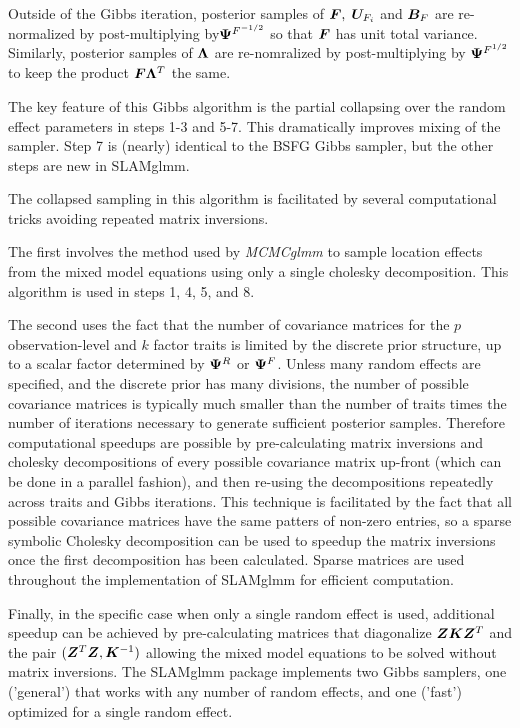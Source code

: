 \documentclass[11pt]{amsart}
\newcommand*{\B}[1]{\ifmmode\bm{#1}\else\textbf{#1}\fi}
\begin{document}
Outside of the Gibbs iteration, posterior samples of $\B{F},\; \B{U}_{F_i}$  and $\B{B}_F$ are re-normalized by post-multiplying by$\B{\Psi}^{F^{-1/2}}$ so that $\B{F}$ has unit total variance. Similarly, posterior samples of $\B{\Lambda}$ are re-nomralized by post-multiplying by $\B{\Psi}^{F^{1/2}}$ to keep the product $\B{F\Lambda}^T$ the same.


The key feature of this Gibbs algorithm is the partial collapsing over the random effect parameters in steps 1-3 and 5-7. This dramatically improves mixing of the sampler. Step 7 is (nearly) identical to the BSFG Gibbs sampler, but the other steps are new in SLAMglmm.

The collapsed sampling in this algorithm is facilitated by several computational tricks avoiding repeated matrix inversions. 

The first involves the method used by \emph{MCMCglmm} to sample location effects from the mixed model equations using only a single cholesky decomposition. This algorithm is used in steps 1, 4, 5, and 8.

The second uses the fact that the number of covariance matrices for the $p$ observation-level and $k$ factor traits is limited by the discrete prior structure, up to a scalar factor determined by $\B{\Psi}^R$ or $\B{\Psi}^F$. Unless many random effects are specified, and the discrete prior has many divisions, the number of possible covariance matrices is typically much smaller than the  number of traits times the number of iterations necessary to generate sufficient posterior samples. Therefore computational speedups are possible by pre-calculating matrix inversions and cholesky decompositions of every possible covariance matrix up-front (which can be done in a parallel fashion), and then re-using the decompositions repeatedly across traits and Gibbs iterations.
This technique is facilitated by the fact that all possible covariance matrices have the same patters of non-zero entries, so a sparse symbolic Cholesky decomposition can be used to speedup the matrix inversions once the first decomposition has been calculated. Sparse matrices are used throughout the implementation of SLAMglmm for efficient computation.

Finally, in the specific case when only a single random effect is used, additional speedup can be achieved by pre-calculating matrices that diagonalize $\B{ZKZ}^T$ and the pair $(\B{Z}^T\B{Z}, \B{K}^{-1})$ allowing the mixed model equations to be solved without matrix inversions. The SLAMglmm package implements two Gibbs samplers, one ('general') that works with any number of random effects, and one ('fast') optimized for a single random effect.
\end{document}
